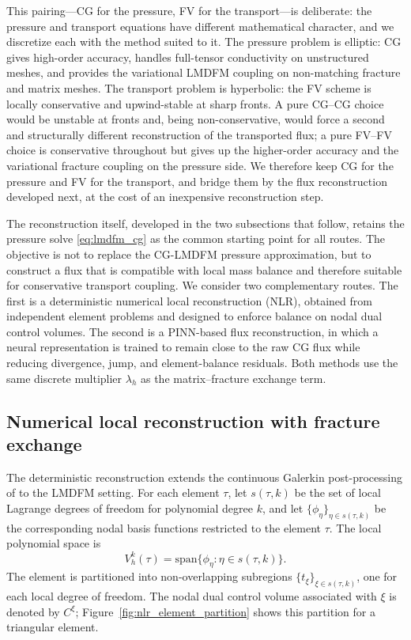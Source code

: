 \documentclass[a4paper,fleqn]{cas-sc}
\begin{document}
This pairing---CG for the pressure, FV for the transport---is deliberate: the
pressure and transport equations have different mathematical character, and we
discretize each with the method suited to it. The pressure problem is elliptic:
CG gives high-order accuracy, handles full-tensor conductivity on unstructured
meshes, and provides the variational LMDFM coupling on non-matching fracture and
matrix meshes. The transport problem is hyperbolic: the FV scheme is locally
conservative and upwind-stable at sharp fronts. A pure CG--CG choice would be
unstable at fronts and, being non-conservative, would force a second and
structurally different reconstruction of the transported flux; a pure FV--FV
choice is conservative throughout but gives up the higher-order accuracy and the
variational fracture coupling on the pressure side. We therefore keep CG for the
pressure and FV for the transport, and bridge them by the flux reconstruction
developed next, at the cost of an inexpensive reconstruction step.

The reconstruction itself, developed in the two subsections that follow, retains
the pressure solve \eqref{eq:lmdfm_cg} as the common starting point for all
routes. The objective is not to replace the CG-LMDFM
pressure approximation, but to construct a flux that is compatible with local
mass balance and therefore suitable for conservative transport coupling. We
consider two complementary routes. The first is a deterministic numerical local
reconstruction (NLR), obtained from independent element problems and designed to
enforce balance on nodal dual control volumes. The second is a PINN-based flux
reconstruction, in which a neural representation is trained to remain close to
the raw CG flux while reducing divergence, jump, and element-balance residuals.
Both methods use the same discrete multiplier \(\lambda_h\) as the
matrix--fracture exchange term.

\subsection{Numerical local reconstruction with fracture exchange}
\label{subsec:nlr}

The deterministic reconstruction extends the continuous Galerkin
post-processing of \citet{DENG2019166} to the LMDFM setting. For each element
\(\tau\), let \(s(\tau,k)\) be the set of local Lagrange degrees of freedom for
polynomial degree \(k\), and let \(\{\phi_\eta\}_{\eta\in s(\tau,k)}\) be the
corresponding nodal basis functions restricted to the element \(\tau\). The
local polynomial space is
\[
  V_h^k(\tau)=\mathrm{span}\{\phi_\eta:\eta\in s(\tau,k)\}.
\]
The element is partitioned into non-overlapping subregions
\(\{t_\xi\}_{\xi\in s(\tau,k)}\), one for each local degree of freedom. The
nodal dual control volume associated with \(\xi\) is denoted by \(C^\xi\);
Figure~\ref{fig:nlr_element_partition} shows this partition for a triangular
element.
\end{document}
